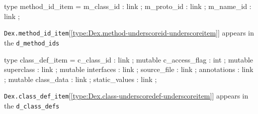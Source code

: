 \documentclass[11pt]{article}
\begin{document}
\label{type:Dex.method-underscoreid-underscoreitem}\begin{ocamldoccode}
type method_id_item = {}
  m_class_id : link ;
  m_proto_id : link ;
  m_name_id : link ;
{}
\end{ocamldoccode}
\begin{ocamldocdescription}
{\tt{Dex.method\_id\_item}}[\ref{type:Dex.method-underscoreid-underscoreitem}] appears in the {\tt{d\_method\_ids}}


\end{ocamldocdescription}




\label{type:Dex.class-underscoredef-underscoreitem}\begin{ocamldoccode}
type class_def_item = {}
  c_class_id : link ;
  mutable c_access_flag : int ;
  mutable superclass : link ;
  mutable interfaces : link ;
  source_file : link ;
  annotations : link ;
  mutable class_data : link ;
  static_values : link ;
{}
\end{ocamldoccode}
\begin{ocamldocdescription}
{\tt{Dex.class\_def\_item}}[\ref{type:Dex.class-underscoredef-underscoreitem}] appears in the {\tt{d\_class\_defs}}


\end{ocamldocdescription}
\end{document}
